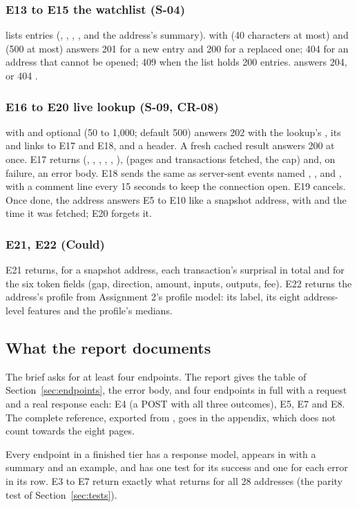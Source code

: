 \subsubsection*{E13 to E15 \quad the watchlist \quad (S-04)}
 lists entries (, , , ,
 and the address's summary).  with
 (40 characters at most) and  (500 at most) answers 201 for a new entry and
200 for a replaced one; 404  for an address that cannot be opened; 409 when the
list holds 200 entries.  answers 204, or 404 .

\subsubsection*{E16 to E20 \quad live lookup \quad (S-09, CR-08)}
 with  and optional  (50 to 1,000; default
500) answers 202 with the lookup's , its  and links to E17 and E18, and a
 header. A fresh cached result answers 200 at once.  E17 returns
 (, , , , ,
),  (pages and transactions fetched, the cap) and, on failure, an
error body. E18 sends the same as server-sent events named , ,
 and , with a comment line every 15 seconds to keep the connection open.
E19 cancels. Once done, the address answers E5 to E10 like a snapshot address, with
 and the time it was fetched; E20 forgets it.

\subsubsection*{E21, E22 \quad (Could)}
E21 returns, for a snapshot address, each transaction's surprisal in total and for the six token
fields (gap, direction, amount, inputs, outputs, fee). E22 returns the address's profile from
Assignment 2's profile model: its label, its eight address-level features and the profile's medians.

\subsection{What the report documents}

The brief asks for at least four endpoints. The report gives the table of
Section~\ref{sec:endpoints}, the error body, and four endpoints in full with a request and a real
response each: E4 (a POST with all three outcomes), E5, E7 and E8. The complete reference, exported
from , goes in the appendix, which does not count towards the eight pages.

\begin{done}
Every endpoint in a finished tier has a response model, appears in  with a summary and
an example, and has one test for its success and one for each error in its row.  E3 to E7
return exactly what  returns for all 28 addresses (the parity test of
Section~\ref{sec:tests}).
\end{done}
